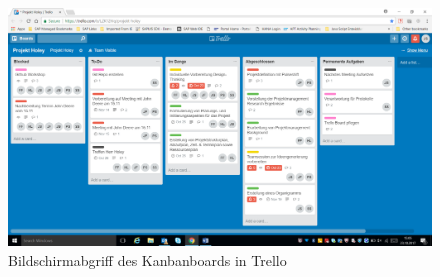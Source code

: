 \begin{figure}[H]
\centering
\includegraphics[width=1\textwidth]{images/trello}
\caption[Bildschirmabgriff des Kanbanboards in Trello]{Bildschirmabgriff des Kanbanboards in Trello}
\label{fig:frame:kanban}
\end{figure}
